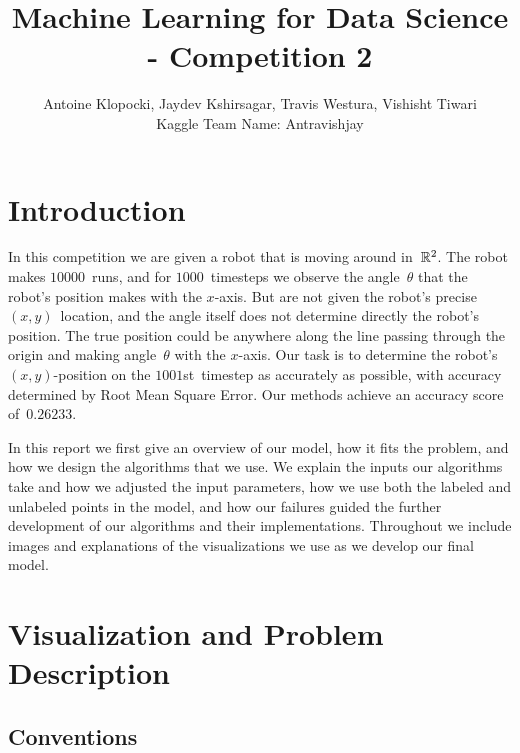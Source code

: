 \documentclass[twoside]{article}
\title{Machine Learning for Data Science - Competition 2}
\author{Antoine Klopocki, Jaydev Kshirsagar, Travis Westura, Vishisht Tiwari\\Kaggle Team Name: Antravishjay}
\date{\vspace{-5ex}} %
\begin{document}
\maketitle
\thispagestyle{empty}

\section{Introduction}\label{sec:introduction}

In this competition we are given a robot that is moving around in~$\mathbb{R}^2$.
The robot makes $\num{10000}$~runs, and for $\num{1000}$~timesteps we observe the angle~$\theta$ that the robot's position makes with the $x$-axis.
But are not given the robot's precise ${(x, y)}$~location, and the angle itself does not determine directly the robot's position.
The true position could be anywhere along the line passing through the origin and making angle~$\theta$ with the $x$-axis.
Our task is to determine the robot's ${(x, y)}$-position on the $\num{1001}$st~timestep as accurately as possible, with accuracy determined by Root Mean Square Error.
Our methods achieve an accuracy score of~$\bm{0.26233}$.

In this report we first give an overview of our model, how it fits the problem, and how we design the algorithms that we use.
We explain the inputs our algorithms take and how we adjusted the input parameters, how we use both the labeled and unlabeled points in the model, and how our failures guided the further development of our algorithms and their implementations.
Throughout we include images and explanations of the visualizations we use as we develop our final model.

\section{Visualization and Problem Description}\label{sec:vis-and-prob-desc}

\subsection{Conventions}\label{sec:conventions}
\end{document}
